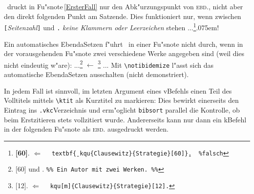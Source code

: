 \documentclass[12pt,a4paper]{article}
\newcommand{\pbs}{\string\ \unskip}
\newcommand{\bs}{\protect\pbs}
\begin{document}
\BibArts\ druckt in Fu"snote\,\ref{ErsterFall} nur den Abk"urzungspunkt von \textsc{ebd.}, 
nicht aber den direkt folgenden Punkt am Satzende. Dies funktioniert nur, 
wenn zwischen \verb|[|\textit{Seitenzahl}\verb|]| und \verb|.|
\textit{keine Klammern oder Leerzeichen} stehen ...\footnote{\textbf{[60]}.
\hspace{5.43em} $\Leftarrow$ \ \texttt{\bs textbf\b{\{}\bs kqu\{Clausewitz\}\{Strategie\}[60]\b{\}}.
\texttt{ \%falsch}}}\kern.075em!

Ein automatisches Ebenda\hy Setzen f"uhrt \BibArts\ in einer Fu"snote nicht durch, 
wenn in der vorausgehenden Fu"snote zwei verschiedene Werke angegeben sind 
(weil dies nicht eindeutig w"are): 
\hspace{.1em}...\footnote{[60] und .
\hspace{3em} \texttt{\%\% Ein Autor mit zwei Werken. \%\%}}
$\leftarrow$
\footnote{[12]. 
\hspace{3.85em} $\Leftarrow$ \ \texttt{\bs kqu[m]\{Clausewitz\}\{Strategie\}[12].}}
... Mit \verb|\notibidemize| l"asst sich das automatische Ebenda\hy Setzen ausschalten
(nicht demonstriert).

In jedem Fall ist sinnvoll, im letzten Argument eines v\fhy Befehls 
einen Teil des Volltitels mittels \hspace{-.1em}\verb|\ktit| als Kurztitel zu
markieren: Dies bewirkt einerseits den Eintrag ins \hspace{-.25em}\verb|.vkc|\hy Verzeichnis
und erm"oglicht \texttt{bibsort} parallel die Kontrolle, ob beim Erstzitieren stets
vollzitiert wurde. Andererseits kann nur dann ein k\fhy Befehl in der 
folgenden Fu"snote als \textsc{ebd.} ausgedruckt werden. 
\end{document}
